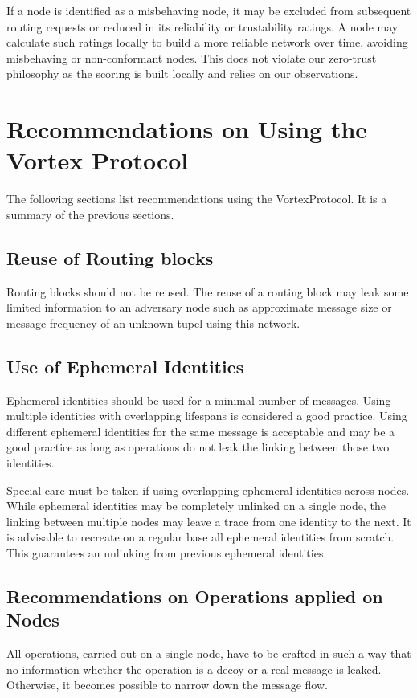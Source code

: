 If a node is identified as a misbehaving node, it may be excluded from subsequent routing requests or reduced in its reliability or trustability ratings. A node may calculate such ratings locally to build a more reliable network over time, avoiding misbehaving or non-conformant nodes. This does not violate our zero-trust philosophy as the scoring is built locally and relies on our observations.

\chapter{Recommendations on Using the Vortex Protocol}
The following sections list recommendations using the VortexProtocol. It is a summary of the previous sections.

\section{Reuse of Routing blocks\label{sec:reuseRB}}
Routing blocks should not be reused. The reuse of a routing block may leak some limited information to an adversary node such as approximate message size or message frequency of an unknown tupel using this network.

\section{Use of Ephemeral Identities}
Ephemeral identities should be used for a minimal number of messages. Using multiple identities with overlapping lifespans is considered a good practice. Using different ephemeral identities for the same message is acceptable and may be a good practice as long as operations do not leak the linking between those two identities.

Special care must be taken if using overlapping ephemeral identities across nodes. While ephemeral identities may be completely unlinked on a single node, the linking between multiple nodes may leave a trace from one identity to the next. It is advisable to recreate on a regular base all ephemeral identities from scratch. This guarantees an unlinking from previous ephemeral identities.

\section{Recommendations on Operations applied on Nodes}
All operations, carried out on a single node, have to be crafted in such a way that no information whether the operation is a decoy or a real message is leaked. Otherwise, it becomes possible to narrow down the message flow.

